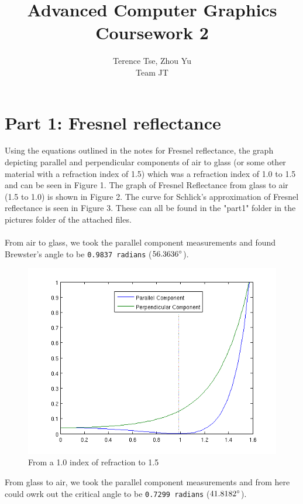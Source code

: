 \documentclass{article}
\begin{document}
\title{Advanced Computer Graphics\\ Coursework 2}
\author{Terence Tse, Zhou Yu \\ Team JT}
\maketitle
\newpage

\section{Part 1: Fresnel reflectance}
Using the equations outlined in the notes for Fresnel reflectance,
the graph depicting parallel and perpendicular components of air to glass
(or some other material with a refraction index of 1.5)
which was a refraction index of 1.0 to 1.5 and can be seen in Figure 1. The
graph of Fresnel Reflectance from glass to air (1.5 to 1.0) is shown in 
Figure 2. The curve for Schlick's approximation of Fresnel
reflectance is seen in Figure 3. These can all be found in the "part1" folder
in the pictures folder of the attached files.\\
\\
From air to glass, we took the parallel component measurements and found
Brewster's angle to be \texttt{0.9837 radians} ($56.3636\degree$).

\begin{figure}[h]
	\centering
	\includegraphics[scale=0.5]{pics/part1/air2glass.png}
	\caption{From a 1.0 index of refraction to 1.5}
\end{figure}

From glass to air, we took the parallel component measurements and from here
could owrk out the critical angle to be \texttt{0.7299 radians} 
($41.8182\degree$).
\end{document}
